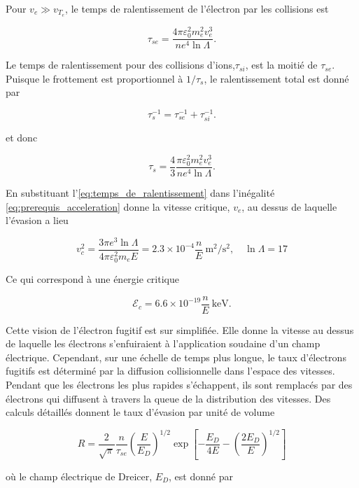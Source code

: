 \documentclass[main.tex]{subfiles}
\begin{document}
Pour \( v_e \gg v_{T_e} \), le temps de ralentissement de l'électron par les collisions est

\[
	\tau_{se} = \frac{4 \pi \varepsilon_0^2 m_e^2 v_e^3}{n e^4 \ln \Lambda}.
\]

\noindent Le temps de ralentissement pour des collisions d'ions,\( \tau_{si} \), est la moitié de \( \tau_{se} \).
Puisque le frottement est proportionnel à \( 1/\tau_s \), le ralentissement total est donné par

\[
	\tau_s^{-1} = \tau_{se}^{-1} + \tau_{si}^{-1}.
\]

\noindent et donc

\begin{equation}
	\tau_{s} = \frac{4}{3} \frac{\pi \varepsilon_0^2 m_e^2 v_e^3}{n e^4 \ln \Lambda}.
	\label{eq:temps_de_ralentissement}
\end{equation}

\noindent En substituant l'\autoref{eq:temps_de_ralentissement} dans l'inégalité \ref{eq:prerequis_acceleration} donne la vitesse critique, \( v_e \), au dessus de laquelle l'évasion a lieu

\begin{equation}
	v_c^2 = \frac{3 \pi e^3 \ln \Lambda}{4 \pi \varepsilon_0^2 m_e E} = 2.3 \times 10^{-4} \frac{n}{E} \SI{}{\meter\squared\per\second\squared}, \quad \ln \Lambda = 17
	\label{eq:vitesse_critique_evasion} 
\end{equation}

\noindent Ce qui correspond à une énergie critique

\[
	\mathcal{E}_c = 6.6 \times 10^{-19} \frac{n}{E} \SI{}{\kilo\electronvolt}. 
\]

Cette vision de l'électron fugitif est sur simplifiée.
Elle donne la vitesse au dessus de laquelle les électrons s'enfuiraient à l'application soudaine d'un champ électrique.
Cependant, sur une échelle de temps plus longue, le taux d'électrons fugitifs est déterminé par la diffusion collisionnelle dans l'espace des vitesses.
Pendant que les électrons les plus rapides s’échappent, ils sont remplacés par des électrons qui diffusent à travers la queue de la distribution des vitesses.
Des calculs détaillés donnent le taux d'évasion par unité de volume

\[
	R = \frac{2}{\sqrt{\pi}} \frac{n}{\tau_{se}} \left( \frac{E}{E_D}\right)^{1/2} \exp\left[ - \frac{E_D}{4E} - \left( \frac{2 E_D}{E}\right)^{1/2}\right]
\]

\noindent où le champ électrique de Dreicer, \( E_D \), est donné par
\end{document}
